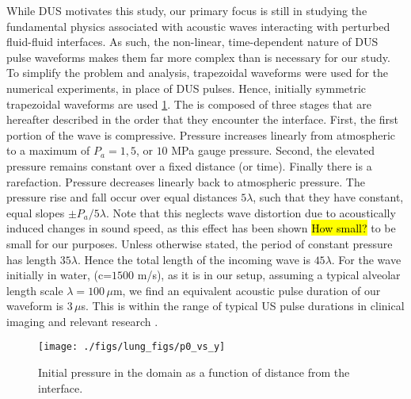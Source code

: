 While \ac{DUS} motivates this study, our primary focus is still in
studying the fundamental physics associated with acoustic waves
interacting with perturbed fluid-fluid interfaces. As such, the
non-linear, time-dependent nature of \ac{DUS} pulse waveforms makes
them far more complex than is necessary for our study. To simplify the
problem and analysis, trapezoidal waveforms were used for the
numerical experiments, in place of \ac{DUS} pulses. Hence, initially
symmetric trapezoidal waveforms are used \ref{fig:p0_vs_y}. The is
composed of three stages that are hereafter described in the order
that they encounter the interface. First, the first portion of the
wave is compressive. Pressure increases linearly from atmospheric to a
maximum of $P_a=1, 5$, or $10$ MPa gauge pressure. Second, the
elevated pressure remains constant over a fixed distance (or
time). Finally there is a rarefaction. Pressure decreases linearly
back to atmospheric pressure. The pressure rise and fall occur over
equal distances $5\lambda$, such that they have constant, equal slopes
$\pm P_{a}/5\lambda$. Note that this neglects wave distortion due to
acoustically induced changes in sound speed, as this effect has been
shown \hl{How small?} to be small for our purposes. Unless otherwise
stated, the period of constant pressure has length $35\lambda$. Hence
the total length of the incoming wave is $45\lambda$. For the wave
initially in water, (c=$1500$ m/s), as it is in our setup, assuming a
typical alveolar length scale $\lambda=100 \, \mu$m, we find an
equivalent acoustic pulse duration of our waveform is $3 \, \mu$s.
This is within the range of typical \ac{US} pulse durations in
clinical imaging \citep{Edelman2005} and relevant research \cite{Obrien2006b}.

\begin{figure} 
  \centering
  \texttt{[image: ./figs/lung\_figs/p0\_vs\_y]}
  \caption{Initial pressure in the domain as a function of distance from the interface.}
  \label{fig:p0_vs_y}
\end{figure}

